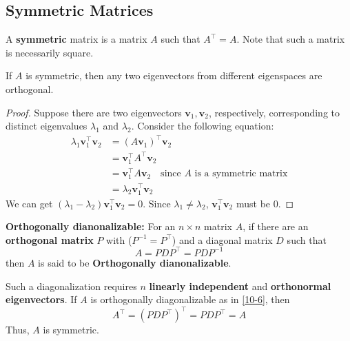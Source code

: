     \subsection{Symmetric Matrices}
    \begin{Def}
        A \textbf{symmetric} matrix is a matrix $A$ such that $A^{\top} = A$. Note that such a matrix is necessarily square.

    \end{Def}
    \begin{Thm}
        If $A$ is symmetric, then any two eigenvectors from different eigenspaces are orthogonal.

        \begin{proof}
            Suppose there are two eigenvectors $\mathbf{v}_1, \mathbf{v}_2$, respectively, corresponding to distinct eigenvalues $\lambda_1$ and $\lambda_2$. Consider the following equation:
            \begin{align*}
                \lambda _1 \mathbf{v}_1^{\top}\mathbf{v}_2 & = (A\mathbf{v}_1)^{\top} \mathbf{v}_2\\
                & = \mathbf{v}_1^{\top} A^{\top}\mathbf{v}_2\\
                & = \mathbf{v}_1^{\top} A\mathbf{v}_2\quad \text{since } A \text{ is a symmetric matrix}\\
                & = \lambda _2 \mathbf{v}_1^{\top} \mathbf{v}_2
            \end{align*}
            We can get $(\lambda_1 - \lambda_2)\mathbf{v}_1^{\top} \mathbf{v}_2 = 0$. Since $\lambda_1 \neq \lambda_2$, $\mathbf{v}_1^{\top} \mathbf{v}_2$ must be $0$.
        \end{proof}
    \end{Thm}
    \begin{Def}
        \textbf{Orthogonally dianonalizable:} For an $n \times n$ matrix $A$, if there are an \textbf{orthogonal matrix} $P$ with ($P^{-1} = P^{\top}$) and a diagonal matrix $D$ such that 
        \begin{equation}\label{10-6}
            A = PDP^{\top} = PDP^{-1}
        \end{equation}
        then $A$ is said to be \textbf{Orthogonally dianonalizable}.

        \begin{Rem}
            Such a diagonalization requires $n$ \textbf{linearly independent} and \textbf{orthonormal eigenvectors}.
            If $A$ is orthogonally diagonalizable as in \cref{10-6}, then
            \begin{equation*}
                A^{\top} = (PDP^{\top})^{\top} = PDP^{\top} = A
            \end{equation*}
            Thus, $A$ is symmetric.
        \end{Rem}
    \end{Def}

